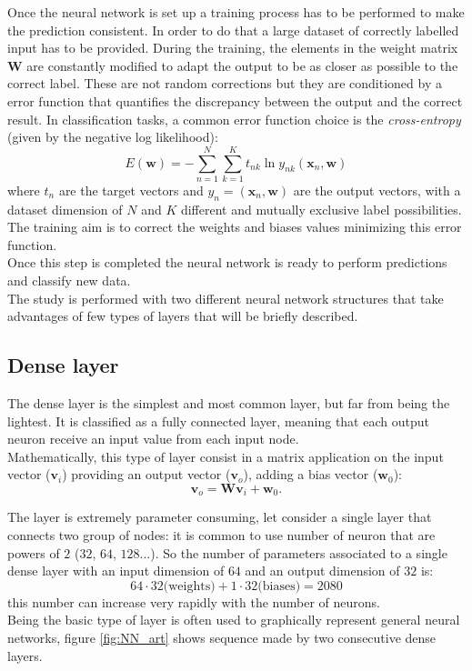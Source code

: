Once the neural network is set up a training process has to be performed to make the prediction consistent. In order to do that a large dataset of correctly labelled input has to be provided. During the training, the elements in the weight matrix $\bm{W}$ are constantly modified to adapt the output to be as closer as possible to the correct label. These are not random corrections but they are conditioned by a error function that quantifies the discrepancy between the output and the correct result. In classification tasks, a common error function choice is the \textit{cross-entropy} (given by the negative log likelihood):
\begin{equation}\label{eq:err_func}
    E(\bm{w}) = -\sum_{n=1}^N\sum_{k=1}^K t_{nk}\ln{y_{nk}(\bm{x}_n,\bm{w})}
\end{equation}
where $t_n$ are the target vectors and $y_n=(\bm{x}_n,\bm{w})$ are the output vectors, with a dataset dimension of $N$ and $K$ different and mutually exclusive label possibilities.\\
The training aim is to correct the weights and biases values minimizing this error function.\\
Once this step is completed the neural network is ready to perform predictions and classify new data.\\

The study is performed with two different neural network structures that take advantages of few types of layers that will be briefly described.

\subsection*{Dense layer}
The dense layer is the simplest and most common layer, but far from being the lightest. It is classified as a fully connected layer, meaning that each output neuron receive an input value from each input node.\\
Mathematically, this type of layer consist in a matrix application on the input vector ($\bm{v}_i$) providing an output vector ($\bm{v}_o$), adding a bias vector ($\bm{w}_0$):
\begin{equation}
    \bm{v}_o = \bm{W}\bm{v}_i+\bm{w}_0.
\end{equation}

The layer is extremely parameter consuming, let consider a single layer that connects two group of nodes: it is common to use number of neuron that are powers of $2$ ($32$, $64$, $128$...). So the number of parameters associated to a single dense layer with an input dimension of $64$ and an output dimension of $32$ is:
\begin{equation*}
    64 \cdot 32 \text{(weights)} + 1 \cdot 32 \text{(biases)} = 2080
\end{equation*}
this number can increase very rapidly with the number of neurons.\\
Being the basic type of layer is often used to graphically represent general neural networks, figure \ref{fig:NN_art} shows sequence made by two consecutive dense layers.



